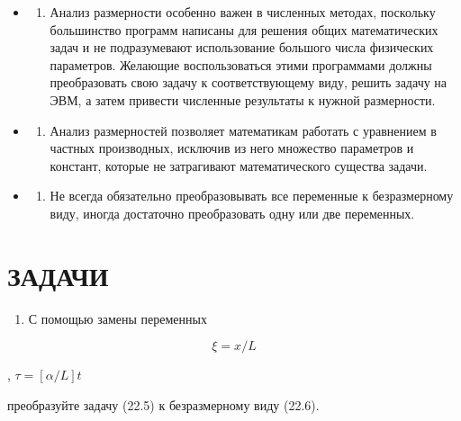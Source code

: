 \documentclass[
  ukrainian,
]{article}
\providecommand{\tightlist}{%
  \setlength{\itemsep}{0pt}\setlength{\parskip}{0pt}}
\begin{document}
\begin{itemize}
\tightlist
\item
  \begin{enumerate}
  \def\labelenumi{\arabic{enumi}.}
  \tightlist
  \item
    Анализ размерности особенно важен в численных методах, поскольку
    большинство программ написаны для решения общих математических задач
    и не подразумевают использование большого числа физических
    параметров. Желающие воспользоваться этими программами должны
    преобразовать свою задачу к соответствующему виду, решить задачу на
    ЭВМ, а затем привести численные результаты к нужной размерности.
  \end{enumerate}
\item
  \begin{enumerate}
  \def\labelenumi{\arabic{enumi}.}
  \setcounter{enumi}{1}
  \tightlist
  \item
    Анализ размерностей позволяет математикам работать с уравнением в
    частных производных, исключив из него множество параметров и
    констант, которые не затрагивают математического существа задачи.
  \end{enumerate}
\item
  \begin{enumerate}
  \def\labelenumi{\arabic{enumi}.}
  \setcounter{enumi}{2}
  \tightlist
  \item
    Не всегда обязательно преобразовывать все переменные к безразмерному
    виду, иногда достаточно преобразовать одну или две переменных.
  \end{enumerate}
\end{itemize}

\section{ЗАДАЧИ}\label{ux437ux430ux434ux430ux447ux438-8}

\begin{enumerate}
\def\labelenumi{\arabic{enumi}.}
\tightlist
\item
  С помощью замены переменных
\end{enumerate}

\[
\xi = x/L
\]

, \(\tau = [\alpha/L] t\)

преобразуйте задачу (22.5) к безразмерному виду (22.6).
\end{document}
